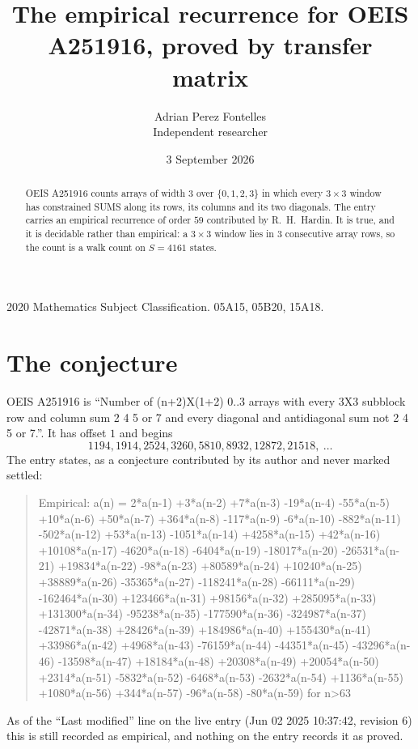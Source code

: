 \documentclass[11pt,a4paper]{article}
\title{The empirical recurrence for OEIS A251916, proved by transfer matrix}
\author{Adrian Perez Fontelles\\ \small Independent researcher}
\date{3 September 2026}
\theoremstyle{plain}
\theoremstyle{definition}
\begin{document}
\maketitle

\begin{abstract}
OEIS A251916 counts arrays of width $3$ over $\{0,1,2,3\}$ in which every $3\times3$ window has
constrained SUMS along its rows, its columns and its two diagonals. The entry carries an
empirical recurrence of order $59$ contributed by R.~H.~Hardin. It is true, and it is
decidable rather than empirical: a $3\times3$ window lies in $3$ consecutive array rows,
so the count is a walk count on $S=4161$ states.
\end{abstract}

\noindent\small 2020 Mathematics Subject Classification. 05A15, 05B20, 15A18.\normalsize

\section{The conjecture}

OEIS A251916 is ``Number of (n+2)X(1+2) 0..3 arrays with every 3X3 subblock row and column sum 2 4 5 or 7 and every diagonal and antidiagonal sum not 2 4 5 or 7.''. It has offset $1$ and begins
\[
1194, 1914, 2524, 3260, 5810, 8932, 12872, 21518,\ \dots
\]
The entry states, as a conjecture contributed by its author and never marked settled:
\begin{quote}
Empirical: a(n) = 2*a(n-1) +3*a(n-2) +7*a(n-3) -19*a(n-4) -55*a(n-5) +10*a(n-6) +50*a(n-7) +364*a(n-8) -117*a(n-9) -6*a(n-10) -882*a(n-11) -502*a(n-12) +53*a(n-13) -1051*a(n-14) +4258*a(n-15) +42*a(n-16) +10108*a(n-17) -4620*a(n-18) -6404*a(n-19) -18017*a(n-20) -26531*a(n-21) +19834*a(n-22) -98*a(n-23) +80589*a(n-24) +10240*a(n-25) +38889*a(n-26) -35365*a(n-27) -118241*a(n-28) -66111*a(n-29) -162464*a(n-30) +123466*a(n-31) +98156*a(n-32) +285095*a(n-33) +131300*a(n-34) -95238*a(n-35) -177590*a(n-36) -324987*a(n-37) -42871*a(n-38) +28426*a(n-39) +184986*a(n-40) +155430*a(n-41) +33986*a(n-42) +4968*a(n-43) -76159*a(n-44) -44351*a(n-45) -43296*a(n-46) -13598*a(n-47) +18184*a(n-48) +20308*a(n-49) +20054*a(n-50) +2314*a(n-51) -5832*a(n-52) -6468*a(n-53) -2632*a(n-54) +1136*a(n-55) +1080*a(n-56) +344*a(n-57) -96*a(n-58) -80*a(n-59) for n>63
\end{quote}
As of the ``Last modified'' line on the live entry (Jun 02 2025 10:37:42, revision 6) this is still
recorded as empirical, and nothing on the entry records it as proved.
\end{document}
